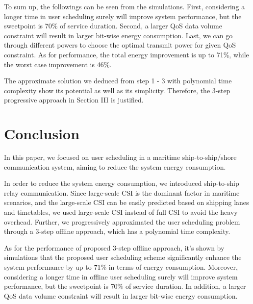 \documentclass[conference]{IEEEtran}
\begin{document}
 
 To sum up, the followings can be seen from the simulations. 
 First, considering a longer time in user scheduling surely will improve system performance, but the sweetpoint is 70\% of service duration. 
 Second, a larger QoS data volume constraint will result in larger bit-wise energy consumption. 
 Last, we can go through different powers to choose the optimal transmit power for given QoS constraint. As for performance, the total energy improvement is up to 71\%, while the worst case improvement is 46\%. 

 The approximate solution we deduced from step 1 - 3 with polynomial time complexity show its potential as well as its simplicity. Therefore, the 3-step progressive approach in Section III is justified. 
 
 \section{Conclusion}\label{sec:5}
 
 In this paper, we focused on user scheduling in a maritime ship-to-ship/shore communication system, aiming to reduce the system energy consumption. 
 
 In order to reduce the system energy consumption, we introduced ship-to-ship relay communication. 
 Since large-scale CSI is the dominant factor in maritime scenarios, and the large-scale CSI can be easily predicted based on shipping lanes and timetables, we used large-scale CSI instead of full CSI to avoid the heavy overhead. Further, we progressively approximated the user scheduling problem through a 3-step offline approach, which has a polynomial time complexity. 
 
 As for the performance of proposed 3-step offline approach, it's shown by simulations that the proposed user scheduling scheme significantly enhance the system performance by up to 71\% in terms of energy consumption. %
 Moreover, considering a longer time in offline user scheduling surely will improve system performance, but the sweetpoint is 70\% of service duration. 
 In addition, a larger QoS data volume constraint will result in larger bit-wise energy consumption. 
\end{document}
